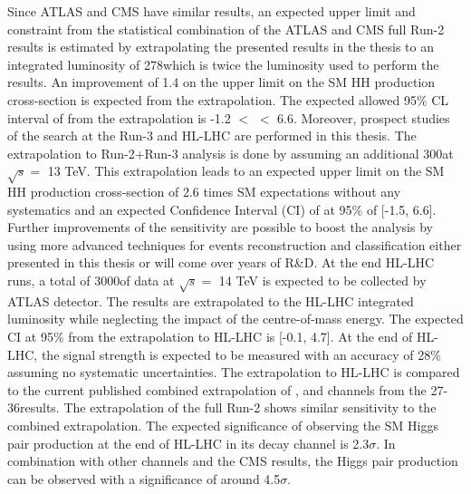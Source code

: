 Since ATLAS and CMS have similar results, an expected upper limit and \kl constraint from the statistical combination of the ATLAS and CMS full Run-2 \HHyybb results is estimated by extrapolating the presented results in the thesis to an integrated luminosity of 278\ifb which is twice the luminosity used to perform the results. An improvement of 1.4 on the upper limit on the SM HH production cross-section is expected from the extrapolation. The expected allowed 95\% CL interval of \kl from the extrapolation is -1.2 $<$ \kl $<$ 6.6. Moreover, prospect studies of the \HHyybb search at the Run-3 and HL-LHC are performed in this thesis. The extrapolation to Run-2+Run-3 analysis is done by assuming an additional 300\ifb at $\sqrt{s} = $ 13 TeV. This extrapolation leads to an expected upper limit on the SM HH production cross-section of 2.6 times SM expectations without any systematics and an expected Confidence Interval (CI) of \kl at 95\% of [-1.5, 6.6]. Further improvements of the sensitivity are possible to boost the \HHyybb analysis by using more advanced techniques for events reconstruction and classification either presented in this thesis or will come over years of R\&D. At the end HL-LHC runs, a total of 3000\ifb of data at $\sqrt{s} = $ 14 TeV is expected to be collected by ATLAS detector. The \HHyybb results are extrapolated to the HL-LHC integrated luminosity while neglecting the impact of the centre-of-mass energy. The expected \kl CI at 95\% from the extrapolation to HL-LHC is [-0.1, 4.7]. At the end of HL-LHC, the signal strength is expected to be measured with an accuracy of 28\% assuming no systematic uncertainties. The extrapolation to HL-LHC is compared to the current published combined extrapolation of \bbbb, \bbtt and \bbyy channels from the 27-36\ifb results. The extrapolation of the full Run-2 \HHyybb shows similar sensitivity to the combined extrapolation. The expected significance of observing the SM Higgs pair production at the end of HL-LHC in its \bbyy decay channel is 2.3$\sigma$. In combination with other channels and the CMS results, the Higgs pair production can be observed with a significance of around 4.5$\sigma$. 